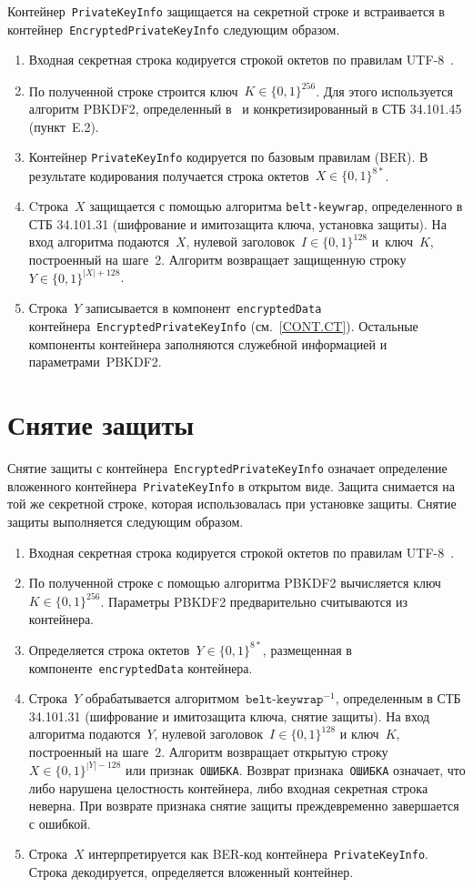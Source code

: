 Контейнер~\texttt{PrivateKeyInfo} защищается на секретной строке и
встраивается в контейнер~\texttt{EncryptedPrivateKeyInfo} следующим
образом.
\begin{enumerate}
\item
Входная секретная строка кодируется строкой октетов по правилам 
UTF-8~\cite{UTF8}. 
\item
По полученной строке строится ключ~$K\in\{0,1\}^{256}$.
Для этого используется алгоритм PBKDF2, определенный в~\cite{PKCS5} и 
конкретизированный в СТБ 34.101.45 (пункт~E.2).
\item
Контейнер \texttt{PrivateKeyInfo} кодируется по базовым правилам (BER).
В результате кодирования получается строка октетов~$X\in\{0,1\}^{8*}$.
\item
Cтрока~$X$ защищается с помощью алгоритма \texttt{belt-keywrap}, 
определенного в СТБ 34.101.31 (шифрование и имитозащита ключа, 
установка защиты). На вход алгоритма подаются~$X$, нулевой 
заголовок~$I\in\{0,1\}^{128}$ и~ключ~$K$, построенный на шаге~2. Алгоритм 
возвращает защищенную строку~$Y\in\{0,1\}^{|X|+128}$. 
\item
Строка~$Y$ записывается в компонент~\texttt{encryptedData}
контейнера~\texttt{EncryptedPrivateKeyInfo} (см.~\ref{CONT.CT}).
Остальные компоненты контейнера
заполняются служебной информацией и параметрами~PBKDF2.
\end{enumerate}

\section{Снятие защиты}\label{CONT.Unwrap}

Снятие защиты с контейнера~\texttt{EncryptedPrivateKeyInfo} 
означает определение вложенного контейнера~\texttt{PrivateKeyInfo} 
в открытом виде. Защита снимается на той же секретной строке, которая 
использовалась при установке защиты. 
Снятие защиты выполняется следующим образом.
\begin{enumerate}
\item
Входная секретная строка кодируется строкой октетов по правилам  
UTF-8~\cite{UTF8}. 
\item
По полученной строке с помощью алгоритма PBKDF2
вычисляется ключ~$K\in\{0,1\}^{256}$.
Параметры PBKDF2 предварительно считываются из контейнера.
\item
Определяется строка октетов~$Y\in\{0,1\}^{8*}$, размещенная в 
компоненте~\texttt{encryptedData} контейнера. 
\item
Строка~$Y$ обрабатывается алгоритмом~$\texttt{belt-keywrap}^{-1}$, определенным 
в СТБ 34.101.31 (шифрование и имитозащита ключа, снятие защиты). 
На вход алгоритма подаются~$Y$, нулевой заголовок~$I\in\{0,1\}^{128}$ и 
ключ~$K$, построенный на шаге~$2$. 
%
Алгоритм возвращает открытую строку~$X\in\{0,1\}^{|Y|-128}$ или 
признак~\texttt{ОШИБКА}.
%
Возврат признака~\texttt{ОШИБКА} означает, что либо нарушена целостность
контейнера, либо входная секретная строка неверна. При возврате признака
снятие защиты преждевременно завершается с ошибкой.
\item
Строка~$X$ интерпретируется как BER-код 
контейнера~\texttt{PrivateKeyInfo}. Строка декодируется, определяется 
вложенный контейнер. 
\end{enumerate}

